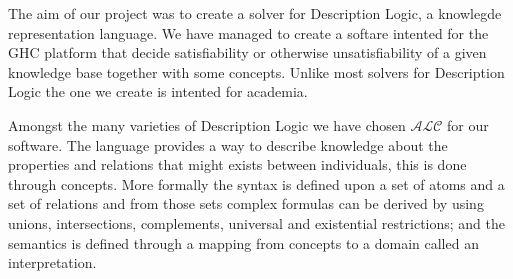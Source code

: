 The aim of our project was to create a solver for Description Logic, a
knowlegde representation language. We have managed to create a softare
intented for the GHC platform that decide satisfiability or otherwise
unsatisfiability of a given knowledge base together with some
concepts. Unlike most solvers for Description Logic the one we
create is intented for academia.

Amongst the many varieties of Description Logic we have chosen
$\mathcal{ALC}$ for our software. The language provides a way to
describe knowledge about the properties and relations that might
exists between individuals, this is done through concepts. More formally
the syntax is defined upon a set of atoms and a set of relations and
from those sets complex formulas can be derived by using unions,
intersections, complements, universal and existential
restrictions; and the semantics is defined through a mapping from concepts
to a domain called an interpretation. 
